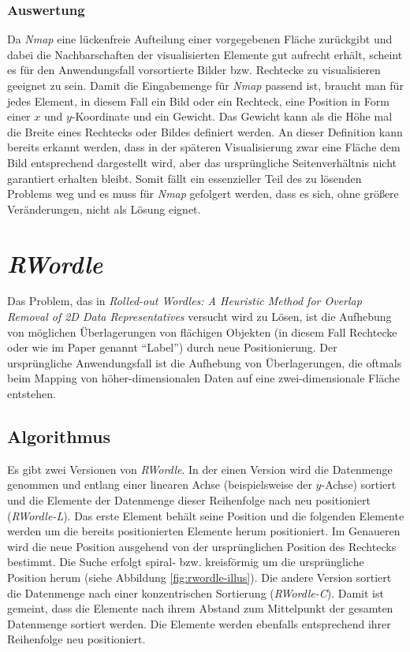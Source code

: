 \documentclass[12pt, ngerman, utf8]{article}
\begin{document}
\subsubsection{Auswertung}
Da \emph{Nmap} eine lückenfreie Aufteilung einer vorgegebenen Fläche zurückgibt und dabei die Nachbarschaften der visualisierten Elemente gut aufrecht erhält, scheint es für den Anwendungsfall vorsortierte Bilder bzw. Rechtecke zu visualisieren geeignet zu sein. Damit die Eingabemenge für \emph{Nmap} passend ist, braucht man für jedes Element, in diesem Fall ein Bild oder ein Rechteck, eine Position in Form einer $x$ und $y$-Koordinate und ein Gewicht. Das Gewicht kann als die Höhe mal die Breite eines Rechtecks oder Bildes definiert werden. An dieser Definition kann bereits erkannt werden, dass in der späteren Visualisierung zwar eine Fläche dem Bild entsprechend dargestellt wird, aber das ursprüngliche Seitenverhältnis nicht garantiert erhalten bleibt. Somit fällt ein essenzieller Teil des zu lösenden Problems weg und es muss für \emph{Nmap} gefolgert werden, dass es sich, ohne größere Veränderungen, nicht als Lösung eignet.

\section{\textit{RWordle}}\label{sec:rwordle}
Das Problem, das in \emph{Rolled-out Wordles: A Heuristic Method for Overlap Removal of 2D Data Representatives} \cite{rwordle} versucht wird zu Lösen, ist die Aufhebung von möglichen Überlagerungen von flächigen Objekten (in diesem Fall Rechtecke oder wie im Paper genannt ``Label'') durch neue Positionierung. Der ursprüngliche Anwendungsfall ist die Aufhebung von Überlagerungen, die oftmals beim Mapping von höher-dimensionalen Daten auf eine zwei-dimensionale Fläche entstehen.

\subsection{Algorithmus}
Es gibt zwei Versionen von \emph{RWordle}. In der einen Version wird die Datenmenge genommen und entlang einer linearen Achse (beispielsweise der $y$-Achse) sortiert und die Elemente der Datenmenge dieser Reihenfolge nach neu positioniert (\emph{RWordle-L}). Das erste Element behält seine Position und die folgenden Elemente werden um die bereits positionierten Elemente herum positioniert. Im Genaueren wird die neue Position ausgehend von der ursprünglichen Position des Rechtecks bestimmt. Die Suche erfolgt spiral- bzw. kreisförmig um die ursprüngliche Position herum (siehe Abbildung \ref{fig:rwordle-illus}). Die andere Version sortiert die Datenmenge nach einer konzentrischen Sortierung (\emph{RWordle-C}). Damit ist gemeint, dass die Elemente nach ihrem Abstand zum Mittelpunkt der gesamten Datenmenge sortiert werden. Die Elemente werden ebenfalls entsprechend ihrer Reihenfolge neu positioniert. 
\end{document}
